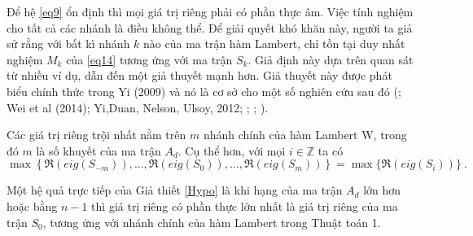 \noindent Để hệ \eqref{eq9} ổn định thì mọi giá trị riêng phải có phần thực âm. Việc tính nghiệm cho tất cả các nhánh là điều không thể. Để giải quyết khó khăn này, người ta giả sử rằng với bất kì nhánh $k$ nào của ma trận hàm Lambert, chỉ tồn tại duy nhất nghiệm $M_k$ của \eqref{eq14} tương ứng với ma trận $S_k$. Giả định này dựa trên quan sát từ nhiều ví dụ, dẫn đến một giả thuyết mạnh hơn. Giả thuyết này được phát biểu chính thức trong Yi (2009) và nó là cơ sở cho một số nghiên cứu sau đó (\cite{Dua12}; Wei et al (2014); Yi,Duan, Nelson, Ulsoy, 2012; \cite{YiEig10}; \cite{YiJune12}; \cite{YiDes10} ).

\begin{gth}\label{Hypo}
Các giá trị riêng trội nhất nằm trên $m$ nhánh chính của hàm Lambert W, trong đó $m$ là số khuyết của ma trận $A_d$. Cụ thể hơn, với mọi $i \in \mathbb{Z}$ ta có
\begin{equation}\label{hypothesis}
\max\left\{ \Re(eig(S_{-m})), ... , \Re(eig(S_{0})), ... , \Re(eig(S_{m})) \right\} = \max \{ \Re(eig(S_i))\} \ .  
\end{equation}
\end{gth}

Một hệ quả trực tiếp của Giả thiết \ref{Hypo} là khi hạng của ma trận $A_d$ lớn hơn hoặc bằng $n-1$ thì giá trị riêng có phần thực lớn nhất là giá trị riêng của ma trận $S_0$, tương ứng với nhánh chính của hàm Lambert trong Thuật toán 1.

